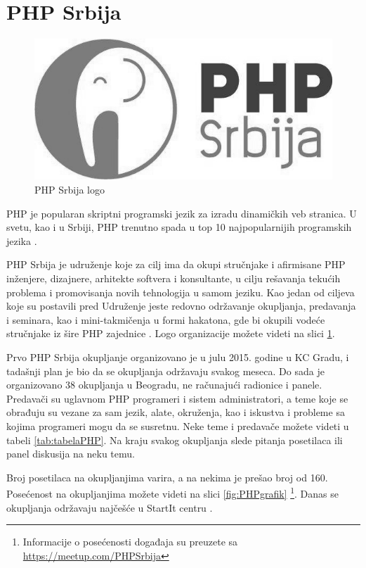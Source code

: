\documentclass[a4paper]{article}
\begin{document}
{\section{PHP Srbija}
\begin{figure}[H]
\begin{center}
\includegraphics[scale=0.25]{php_gray.jpg}
\end{center}
\caption{PHP Srbija logo}
\label{fig:phpSrbija}
\end{figure}
PHP je popularan skriptni programski jezik za izradu dinamičkih veb stranica. U svetu, kao i u Srbiji, PHP trenutno spada u top 10 najpopularnijih programskih jezika \cite{phpMostPopular,phpSerbiaPopularity}.

PHP Srbija je udruženje koje za cilj ima da okupi stručnjake i afirmisane PHP inženjere, dizajnere, arhitekte softvera i konsultante, u cilju rešavanja tekućih problema i promovisanja novih tehnologija u samom jeziku. Kao jedan od ciljeva koje su postavili pred Udruženje jeste redovno održavanje okupljanja, predavanja i seminara, kao i mini-takmičenja u formi hakatona, gde bi okupili vodeće stručnjake iz šire PHP zajednice \cite{phpSrbijaSajt}. Logo organizacije možete videti na slici \ref{fig:phpSrbija}.

Prvo PHP Srbija okupljanje organizovano je u julu 2015. godine u KC Gradu, i tadašnji plan je bio da se okupljanja održavaju svakog meseca. Do sada je organizovano 38 okupljanja u Beogradu, ne računajući radionice i panele. Predavači su uglavnom PHP programeri i sistem administratori, a teme koje se obrađuju su vezane za sam jezik, alate, okruženja, kao i iskustva i probleme sa kojima programeri mogu da se susretnu. Neke teme i predavače možete videti u tabeli \ref{tab:tabelaPHP}.  Na kraju svakog okupljanja slede pitanja posetilaca ili panel diskusija na neku temu.

Broj posetilaca na okupljanjima varira, a na nekima je prešao broj od 160. Posećenost na okupljanjima možete videti na slici \ref{fig:PHPgrafik} \footnote{Informacije o posećenosti događaja su preuzete sa \url{https://meetup.com/PHPSrbija}}. Danas se okupljanja održavaju najčešće u StartIt centru \cite{aboutStarit}.

}
\end{document}
